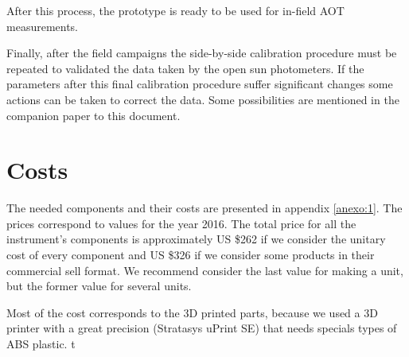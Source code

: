\documentclass[12pt,letterpaper]{article}
\numberwithin{figure}{section}
\numberwithin{equation}{section}
\numberwithin{table}{section}
\begin{document}
After this process, the prototype is ready to be used for in-field AOT measurements. 

Finally, after the field campaigns the side-by-side calibration procedure must be repeated to validated the data taken by the open sun photometers. If the parameters after this final calibration procedure suffer significant changes some actions can be taken to correct the data. Some possibilities are mentioned in the companion paper to this document. 





\newpage
\section{ Costs}
The needed components and their costs are presented in appendix \ref{anexo:1}. The prices correspond to values for the year 2016. The total price for all the instrument's components is approximately US \$262 if we consider the unitary cost of every component and US \$326 if we consider some products in their commercial sell format. We recommend consider the last value for making a unit, but the former value for several units.

Most of the cost corresponds to the 3D printed parts, because we used a 3D printer with a great precision (Stratasys uPrint SE) that needs specials types of ABS plastic. 
t%
\end{document}
